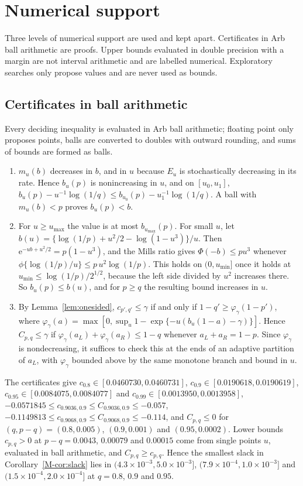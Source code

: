 \documentclass[11pt]{article}
\renewcommand{\_}{\usc\allowbreak}
\begin{document}
\section{Numerical support}\label{sec:s-cert}

Three levels of numerical support are used and kept apart. Certificates in Arb ball arithmetic are proofs. Upper bounds evaluated in double precision with a margin are not interval arithmetic and are labelled numerical. Exploratory searches only propose values and are never used as bounds.

\subsection*{Certificates in ball arithmetic}\label{sec:s-ball}

Every deciding inequality is evaluated in Arb ball arithmetic; floating point only proposes points, balls are converted to doubles with outward rounding, and sums of bounds are formed as balls.
\begin{enumerate}
\item $m_u(b)$ decreases in $b$, and in $u$ because $E_u$ is stochastically decreasing in its rate. Hence $b_u(p)$ is nonincreasing in $u$, and on $[u_0, u_1]$, $b_u(p) - u^{-1}\log(1/q) \le b_{u_0}(p) - u_1^{-1}\log(1/q)$. A ball with $m_u(b) < p$ proves $b_u(p) < b$.
\item For $u \ge u_{\max}$ the value is at most $b_{u_{\max}}(p)$. For small $u$, let $b(u) = \{\log(1/p) + u^2/2 - \log(1 - u^3)\}/u$. Then $\mathrm{e}^{-ub + u^2/2} = p(1 - u^3)$, and the Mills ratio gives $\Phi(-b) \le pu^3$ whenever $\phi\{\log(1/p)/u\} \le p\,u^2\log(1/p)$. This holds on $(0, u_{\min}]$ once it holds at $u_{\min} \le \log(1/p)/2^{1/2}$, because the left side divided by $u^2$ increases there. So $b_u(p) \le b(u)$, and for $p \ge q$ the resulting bound increases in $u$.
\item By Lemma~\ref{lem:onesided}, $c_{p',q'} \le \gamma$ if and only if $1 - q' \ge \varphi_\gamma(1 - p')$, where $\varphi_\gamma(a) = \max[0, \sup_u 1 - \exp\{-u(b_u(1-a) - \gamma)\}]$. Hence $C_{p,q} \le \gamma$ if $\varphi_\gamma(a_L) + \varphi_\gamma(a_R) \le 1 - q$ whenever $a_L + a_R = 1 - p$. Since $\varphi_\gamma$ is nondecreasing, it suffices to check this at the ends of an adaptive partition of $a_L$, with $\varphi_\gamma$ bounded above by the same monotone branch and bound in $u$.
\end{enumerate}
The certificates give $c_{0.8} \in [0.0460730, 0.0460731]$, $c_{0.9} \in [0.0190618, 0.0190619]$, $c_{0.95} \in [0.0084075, 0.0084077]$ and $c_{0.99} \in [0.0013950, 0.0013958]$, $-0.0571845 \le c_{0.9036,0.9} \le C_{0.9036,0.9} \le -0.057$, $-0.1149813 \le c_{0.9068,0.9} \le C_{0.9068,0.9} \le -0.114$, and $C_{p,q} \le 0$ for $(q, p - q) = (0.8, 0.005)$, $(0.9, 0.001)$ and $(0.95, 0.0002)$. Lower bounds $c_{p,q} > 0$ at $p - q = 0.0043$, $0.00079$ and $0.00015$ come from single points $u$, evaluated in ball arithmetic, and $C_{p,q} \ge c_{p,q}$. Hence the smallest slack in Corollary~\ref{M-cor:slack} lies in $(4.3\times10^{-3}, 5.0\times10^{-3}]$, $(7.9\times10^{-4}, 1.0\times10^{-3}]$ and $(1.5\times10^{-4}, 2.0\times10^{-4}]$ at $q = 0.8$, $0.9$ and $0.95$.
\end{document}
